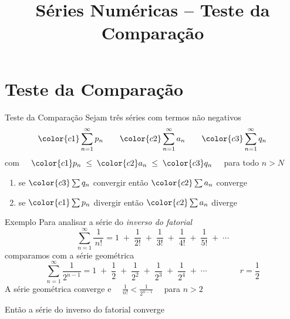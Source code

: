 
\usepackage{integracao_e_series}

\title{Séries Numéricas -- Teste da Comparação}



\addtitle

\section{Teste da Comparação}

\begin{frame}{Teste da Comparação}
  Sejam três séries com termos não negativos
  \[
    {\color{c1} \sum_{n=1}^{\infty} p_n} \qquad
    {\color{c2} \sum_{n=1}^{\infty} a_n} \qquad
    {\color{c3} \sum_{n=1}^{\infty} q_n}
  \]
  com \( \quad {\color{c1}p_n} \;\leq\; {\color{c2}a_n} \;\leq\; {\color{c3}q_n} \quad \) para todo $n>N$

  \pause
  \hspace{\baselineskip}
  \begin{enumerate}
    \item se \tabto{8mm} \(\color{c3} \sum q_n \) convergir \tabto{40mm} então  \(\color{c2} \sum a_n \) converge \\[6mm]\pause
    \item se \tabto{8mm} \(\color{c1} \sum p_n \) divergir  \tabto{40mm} então  \(\color{c2} \sum a_n \) diverge
  \end{enumerate}
\end{frame}

\addtocounter{exemplo}{1}
\begin{frame}{Exemplo \theexemplo}
  Para analisar a série do \emph{inverso do fatorial}
  \[
    \sum_{n=1}^{\infty} \frac{1}{\,n!\,}
    = 1             \;+\;
      \frac{1}{2!}  \;+\;
      \frac{1}{3!}  \;+\;
      \frac{1}{4!}  \;+\;
      \frac{1}{5!}  \;+\;
      \cdots
  \]
  \pause
  comparamos com a série geométrica
  \[ \sum_{n=1}^{\infty} \frac{1}{2^{n-1}}
    = 1              \;+\;
      \frac{1}{2}    \;+\;
      \frac{1}{2^2}  \;+\;
      \frac{1}{2^3}  \;+\;
      \frac{1}{2^4}  \;+\;
      \cdots
      \qquad
      \qquad
      r=\frac{1}{2}
  \]
  \pause
  A série geométrica converge
  \pause
  e
  \(\quad \frac{1}{n!} < \frac{1}{2^{n-1}}\quad\)
  para $n>2$

  \pause
  \vspace{\baselineskip}
  Então a série do inverso do fatorial converge
\end{frame}

